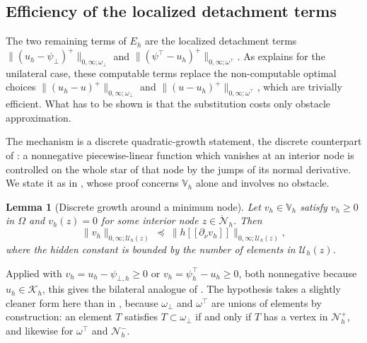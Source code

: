 \documentclass[12pt]{amsart}
\numberwithin{equation}{section}
\theoremstyle{plain}
\newtheorem{lemma}[theorem]{Lemma}
\theoremstyle{definition}
\theoremstyle{remark}
\newcommand{\Om}{\Omega}
\newcommand{\psilo}{\psi_\bot}
\newcommand{\psiup}{\psi^\top}
\newcommand{\psiloh}{\psi_{\bot,h}}
\newcommand{\psiuph}{\psi^\top_h}
\newcommand{\Vh}{\mathbb{V}_h}
\newcommand{\Nh}{\mathcal{N}_h}
\newcommand{\Nhr}{\mathring{\mathcal{N}}_h}
\newcommand{\Uh}{\mathcal{U}_h}
\newcommand{\Kh}{\mathcal{K}_h}
\newcommand{\jump}[1]{[\![#1]\!]}
\newcommand{\ombot}{\omega_\bot}
\newcommand{\omtop}{\omega^\top}
\begin{document}
\subsection{Efficiency of the localized detachment terms}  The two remaining terms of $E_h$ are the localized detachment terms $\|(u_h-\psilo)^+\|_{0,\infty;\ombot}$ and $\|(\psiup-u_h)^+\|_{0,\infty;\omtop}$.  As \cite[\S 6.2]{NSV03} explains for the unilateral case, these computable terms replace the non-computable optimal choices $\|(u_h-u)^+\|_{0,\infty;\ombot}$ and $\|(u-u_h)^+\|_{0,\infty;\omtop}$, which are trivially efficient.  What has to be shown is that the substitution costs only obstacle approximation.

The mechanism is a discrete quadratic-growth statement, the discrete counterpart of \cite[formula (2.9)]{Baiocchi1977}: a nonnegative piecewise-linear function which vanishes at an interior node is controlled on the whole star of that node by the jumps of its normal derivative.  We state it as in \cite[Lemma 6.4]{NSV03}, whose proof concerns $\Vh$ alone and involves no obstacle.

\begin{lemma}[Discrete growth around a minimum node]
\label{lem:growth}
Let $v_h \in \Vh$ satisfy $v_h \ge 0$ in $\Om$ and $v_h(z) = 0$ for some interior node $z \in \Nhr$.  Then
\begin{equation}
\label{eq:growth}
  \|v_h\|_{0,\infty;\Uh(z)} \ \preceq\ \bigl\|h\jump{\partial_\nu v_h}\bigr\|_{0,\infty;\Uh(z)},
\end{equation}
where the hidden constant is bounded by the number of elements in $\Uh(z)$.
\end{lemma}

Applied with $v_h = u_h - \psiloh \ge 0$ or $v_h = \psiuph - u_h \ge 0$, both nonnegative because $u_h \in \Kh$, this gives the bilateral analogue of \cite[Proposition 6.3]{NSV03}.  The hypothesis takes a slightly cleaner form here than in \cite{NSV03}, because $\ombot$ and $\omtop$ are unions of elements by construction: an element $T$ satisfies $T \subset \ombot$ if and only if $T$ has a vertex in $\Nh^+$, and likewise for $\omtop$ and $\Nh^-$.
\end{document}
